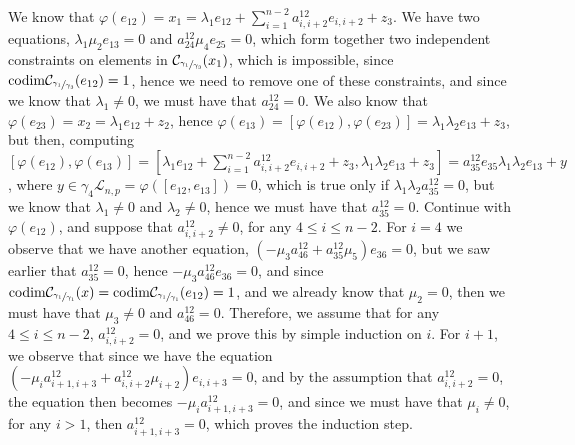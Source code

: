 \documentclass[12pt]{article}
\begin{document}
We know that $\varphi(e_{12})=x_1=\lambda_1 e_{12}+\sum_{i=1}^{n-2}a_{i,i+2}^{12}e_{i,i+2}+z_3$. We have two equations, $\lambda_1\mu_2 e_{13}=0$ and $a_{24}^{12}\mu_4 e_{25}=0$, which form together two independent constraints on elements in $\mathcal{C}_{\sfrac{\gamma_1}{\gamma_3}}(x_1)$, which is impossible, since $\mathrm{codim}\mathcal{C}_{\sfrac{\gamma_1}{\gamma_3}}(e_{12})=1$, hence we need to remove one of these constraints, and since we know that $\lambda_1\neq 0$, we must have that $a_{24}^{12}=0$. We also know that $\varphi(e_{23})=x_2=\lambda_1 e_{12}+z_2$, hence $\varphi(e_{13})=[\varphi(e_{12}),\varphi(e_{23})]=\lambda_1\lambda_2 e_{13}+z_3$, but then, computing $[\varphi(e_{12}),\varphi(e_{13})]=[\lambda_1 e_{12}+\sum_{i=1}^{n-2}a_{i,i+2}^{12}e_{i,i+2}+z_3,\lambda_1\lambda_2 e_{13}+z_3]=a_{35}^{12}e_{35}\lambda_1\lambda_2 e_{13}+y$, where $y\in\gamma_4\mathcal{L}_{n,p}=\varphi([e_{12},e_{13}])=0$, which is true only if $\lambda_1\lambda_2 a_{35}^{12}=0$, but we know that $\lambda_1\neq 0$ and $\lambda_2\neq 0$, hence we must have that $a_{35}^{12}=0$. Continue with $\varphi(e_{12})$, and suppose that $a_{i,i+2}^{12}\neq 0$, for any $4\leq i\leq n-2$. For $i=4$ we observe that we have another equation, $(-\mu_3 a_{46}^{12}+a_{35}^{12}\mu_5)e_{36}=0$, but we saw earlier that $a_{35}^{12}=0$, hence $-\mu_3 a_{46}^{12}e_{36}=0$, and since $\mathrm{codim}\mathcal{C}_{\sfrac{\gamma_1}{\gamma_1}}(x)=\mathrm{codim}\mathcal{C}_{\sfrac{\gamma_1}{\gamma_1}}(e_{12})=1$, and we already know that $\mu_2=0$, then we must have that $\mu_3\neq 0$ and $a_{46}^{12}=0$. Therefore, we assume that for any $4\leq i\leq n-2$, $a_{i,i+2}^{12}=0$, and we prove this by simple induction on $i$. For $i+1$, we observe that since we have the equation $(-\mu_i a_{i+1,i+3}^{12}+a_{i,i+2}^{12}\mu_{i+2})e_{i,i+3}=0$, and by the assumption that $a_{i,i+2}^{12}=0$, the equation then becomes $-\mu_i a_{i+1,i+3}^{12}=0$, and since we must have that $\mu_i\neq 0$, for any $i>1$, then $a_{i+1,i+3}^{12}=0$, which proves the induction step.
\end{document}
